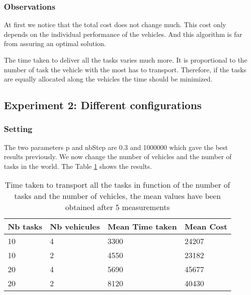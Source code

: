 \documentclass[11pt]{article}
\begin{document}
    
    


\subsubsection{Observations}
At first we notice that the total cost does not change much. This cost only depends on the individual performance of the vehicles. And this algorithm is far from assuring an optimal solution.

The time taken to deliver all the tasks varies much more. It is proportional to the number of task the vehicle with the most has to transport. Therefore, if the tasks are equally allocated along the vehicles the time should be minimized. 


\subsection{Experiment 2: Different configurations}

\subsubsection{Setting}
The two parameters p and nbStep are 0.3 and 1000000 which gave the best results previously. We now change the number of vehicles and the number of tasks in the world. The Table \ref{tab:2} shows the results.
\begin{table}
  \begin{center}
    \begin{tabular}{ | l | l | l | l | }
    \hline
    Nb tasks & Nb vehicules  & Mean Time taken & Mean Cost \\ \hline
    10 & 4 & 3300 & 24207 \\ \hline
    10 & 2 & 4550 & 23182 \\ \hline
    20 & 4 & 5690 & 45677 \\ \hline
    20 & 2 & 8120 & 40430 \\ \hline

    
    \end{tabular}
    \caption{Time taken to transport all the tasks in function of the number of tasks and the number of vehicles, the mean values have been obtained after 5 measurements}
    \label{tab:2}
\end{center}
\end{table}
\end{document}
